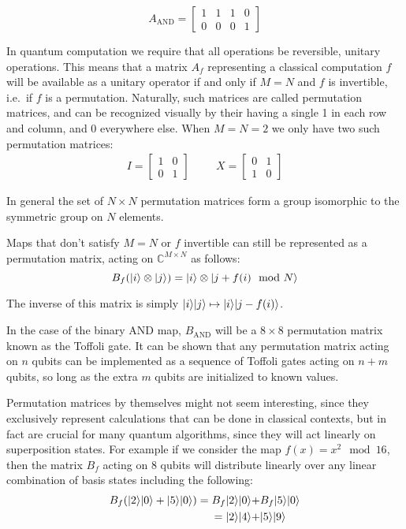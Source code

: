 \[
A_\text{AND} = \left[\begin{matrix}
1&1&1&0\\
0&0&0&1
\end{matrix}\right]
\]

In quantum computation we require that all operations be reversible, unitary operations. This means that a matrix $A_f$ representing a classical computation $f$ will be available as a unitary operator if and only if $M=N$ and $f$ is invertible, i.e.\ if $f$ is a permutation. Naturally, such matrices are called permutation matrices, and can be recognized visually by their having a single 1 in each row and column, and 0 everywhere else. When $M = N = 2$ we only have two such permutation matrices:
\begin{align*}
I = \left[\begin{matrix}
1&0\\
0&1
\end{matrix}\right]
&&&
X = \left[\begin{matrix}
0&1\\
1&0
\end{matrix}\right]
\end{align*}

In general the set of $N\times N$ permutation matrices form a group isomorphic to the symmetric group on $N$ elements.

Maps that don't satisfy $M = N$ or $f$ invertible can still be represented as a permutation matrix, acting on $\mathbb{C}^{M\times N}$ as follows:
\[B_f(| i \rangle\otimes| j \rangle) = | i \rangle\otimes| j+f(i) \mod N \rangle\]

The inverse of this matrix is simply $| i \rangle| j \rangle \mapsto | i \rangle| j-f(i) \rangle$.

In the case of the binary AND map, $B_{\text{AND}}$ will be a $8\times8$ permutation matrix known as the Toffoli gate. It can be shown that any permutation matrix acting on $n$ qubits can be implemented as a sequence of Toffoli gates acting on $n+m$ qubits, so long as the extra $m$ qubits are initialized to known values.

Permutation matrices by themselves might not seem interesting, since they exclusively represent calculations that can be done in classical contexts, but in fact are crucial for many quantum algorithms, since they will act linearly on superposition states. For example if we consider the map $f(x) = x^2\mod 16$, then the matrix $B_f$ acting on 8 qubits will distribute linearly over any linear combination of basis states including the following:
\begin{align*}
B_f(| 2 \rangle| 0 \rangle+| 5 \rangle| 0 \rangle) 
= B_f| 2 \rangle| 0 \rangle +& B_f| 5 \rangle| 0 \rangle
\\= | 2 \rangle| 4 \rangle +& | 5 \rangle| 9 \rangle
\end{align*}

